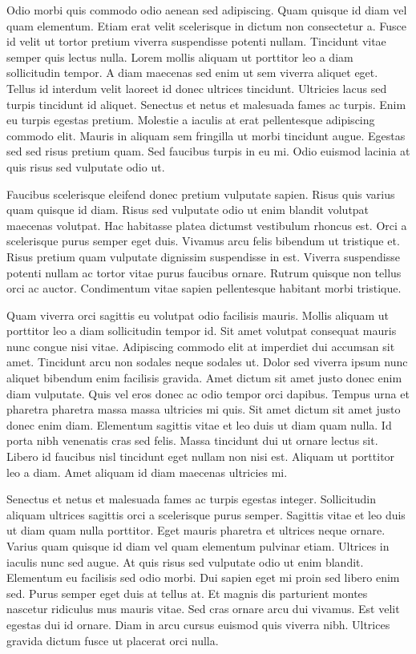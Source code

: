 \documentclass[11pt,a4paper]{article}
\begin{document}
Odio morbi quis commodo odio aenean sed adipiscing. Quam quisque id diam vel quam elementum. Etiam erat velit scelerisque in dictum non consectetur a. Fusce id velit ut tortor pretium viverra suspendisse potenti nullam. Tincidunt vitae semper quis lectus nulla. Lorem mollis aliquam ut porttitor leo a diam sollicitudin tempor. A diam maecenas sed enim ut sem viverra aliquet eget. Tellus id interdum velit laoreet id donec ultrices tincidunt. Ultricies lacus sed turpis tincidunt id aliquet. Senectus et netus et malesuada fames ac turpis. Enim eu turpis egestas pretium. Molestie a iaculis at erat pellentesque adipiscing commodo elit. Mauris in aliquam sem fringilla ut morbi tincidunt augue. Egestas sed sed risus pretium quam. Sed faucibus turpis in eu mi. Odio euismod lacinia at quis risus sed vulputate odio ut.

Faucibus scelerisque eleifend donec pretium vulputate sapien. Risus quis varius quam quisque id diam. Risus sed vulputate odio ut enim blandit volutpat maecenas volutpat. Hac habitasse platea dictumst vestibulum rhoncus est. Orci a scelerisque purus semper eget duis. Vivamus arcu felis bibendum ut tristique et. Risus pretium quam vulputate dignissim suspendisse in est. Viverra suspendisse potenti nullam ac tortor vitae purus faucibus ornare. Rutrum quisque non tellus orci ac auctor. Condimentum vitae sapien pellentesque habitant morbi tristique.

Quam viverra orci sagittis eu volutpat odio facilisis mauris. Mollis aliquam ut porttitor leo a diam sollicitudin tempor id. Sit amet volutpat consequat mauris nunc congue nisi vitae. Adipiscing commodo elit at imperdiet dui accumsan sit amet. Tincidunt arcu non sodales neque sodales ut. Dolor sed viverra ipsum nunc aliquet bibendum enim facilisis gravida. Amet dictum sit amet justo donec enim diam vulputate. Quis vel eros donec ac odio tempor orci dapibus. Tempus urna et pharetra pharetra massa massa ultricies mi quis. Sit amet dictum sit amet justo donec enim diam. Elementum sagittis vitae et leo duis ut diam quam nulla. Id porta nibh venenatis cras sed felis. Massa tincidunt dui ut ornare lectus sit. Libero id faucibus nisl tincidunt eget nullam non nisi est. Aliquam ut porttitor leo a diam. Amet aliquam id diam maecenas ultricies mi.

Senectus et netus et malesuada fames ac turpis egestas integer. Sollicitudin aliquam ultrices sagittis orci a scelerisque purus semper. Sagittis vitae et leo duis ut diam quam nulla porttitor. Eget mauris pharetra et ultrices neque ornare. Varius quam quisque id diam vel quam elementum pulvinar etiam. Ultrices in iaculis nunc sed augue. At quis risus sed vulputate odio ut enim blandit. Elementum eu facilisis sed odio morbi. Dui sapien eget mi proin sed libero enim sed. Purus semper eget duis at tellus at. Et magnis dis parturient montes nascetur ridiculus mus mauris vitae. Sed cras ornare arcu dui vivamus. Est velit egestas dui id ornare. Diam in arcu cursus euismod quis viverra nibh. Ultrices gravida dictum fusce ut placerat orci nulla.
\end{document}
